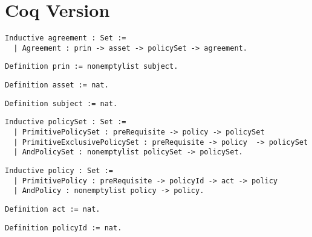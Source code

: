 \section{Coq Version}

\lstset{language=Coq}
\begin{lstlisting}[frame=single, caption={Coq version of agreement},label={lst:agreementcoq}]
Inductive agreement : Set :=
  | Agreement : prin -> asset -> policySet -> agreement.
\end{lstlisting}

\lstset{language=Coq}
\begin{lstlisting}[frame=single, caption={prin},label={lst:princoq}]
Definition prin := nonemptylist subject.
\end{lstlisting}

\lstset{language=Coq}
\begin{lstlisting}[frame=single, caption={asset},label={lst:asset}]
Definition asset := nat.
\end{lstlisting}



\lstset{language=Coq}
\begin{lstlisting}[frame=single, caption={subject},label={lst:subject}]
Definition subject := nat.
\end{lstlisting}


\lstset{language=Coq}
\begin{lstlisting}[frame=single, caption={policySet},label={lst:policySet}]
Inductive policySet : Set :=
  | PrimitivePolicySet : preRequisite -> policy -> policySet 
  | PrimitiveExclusivePolicySet : preRequisite -> policy  -> policySet 
  | AndPolicySet : nonemptylist policySet -> policySet.
\end{lstlisting}

\lstset{language=Coq}
\begin{lstlisting}[frame=single, caption={policy},label={lst:policy}]
Inductive policy : Set :=
  | PrimitivePolicy : preRequisite -> policyId -> act -> policy 
  | AndPolicy : nonemptylist policy -> policy.
\end{lstlisting}

\lstset{language=Coq}
\begin{lstlisting}[frame=single, caption={act},label={lst:act}]
Definition act := nat.
\end{lstlisting}

\lstset{language=Coq}
\begin{lstlisting}[frame=single, caption={policyId},label={lst:policyId}]
Definition policyId := nat.
\end{lstlisting}

